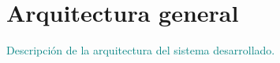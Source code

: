 \section{Arquitectura general}
\textcolor{teal}{Descripción de la arquitectura del sistema desarrollado.}
